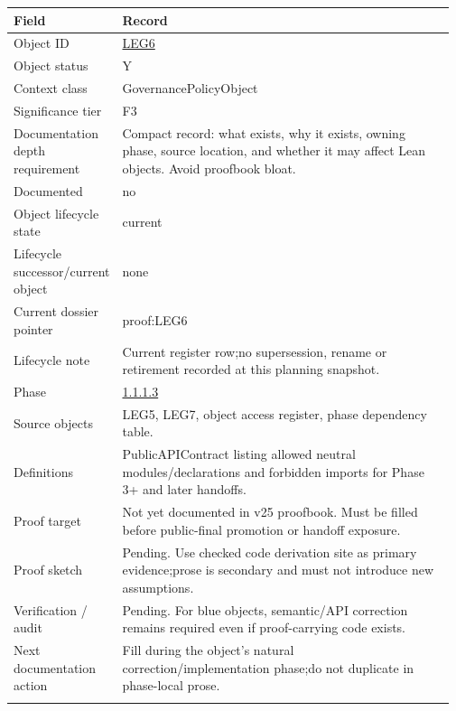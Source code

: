 \begin{longtable}{L{0.16\linewidth} L{0.81\linewidth}}
\hline
\textbf{Field} & \textbf{Record}\\
\hline
Object ID & \hyperlink{object-row-LEG6}{LEG6}\\
\hline\addlinespace[0.20em]
Object status & Y\\
\hline\addlinespace[0.20em]
Context class & GovernancePolicyObject\\
\hline\addlinespace[0.20em]
Significance tier & F3\\
\hline\addlinespace[0.20em]
Documentation depth requirement & Compact record: what exists, why it exists, owning phase, source location, and whether it may affect Lean objects. Avoid proofbook bloat.\\
\hline\addlinespace[0.20em]
Documented & no\\
\hline\addlinespace[0.20em]
Object lifecycle state & current\\
\hline\addlinespace[0.20em]
Lifecycle successor/\allowbreak{}current object & none\\
\hline\addlinespace[0.20em]
Current dossier pointer & proof:LEG6\\
\hline\addlinespace[0.20em]
Lifecycle note & Current register row;\newline no supersession, rename or retirement recorded at this planning snapshot.\\
\hline\addlinespace[0.20em]
Phase & \hyperlink{phase-row-1-1-1-3}{1.1.1.3}\\
\hline\addlinespace[0.20em]
Source objects & LEG5, LEG7, object access register, phase dependency table.\\
\hline\addlinespace[0.20em]
Definitions & PublicAPIContract listing allowed neutral modules/\allowbreak{}declarations and forbidden imports for Phase 3+ and later handoffs.\\
\hline\addlinespace[0.20em]
Proof target & Not yet documented in v25 proofbook. Must be filled before public-final promotion or handoff exposure.\\
\hline\addlinespace[0.20em]
Proof sketch & Pending. Use checked code derivation site as primary evidence;\newline prose is secondary and must not introduce new assumptions.\\
\hline\addlinespace[0.20em]
Verification /\allowbreak{} audit & Pending. For blue objects, semantic/\allowbreak{}API correction remains required even if proof-carrying code exists.\\
\hline\addlinespace[0.20em]
Next documentation action & Fill during the object's natural correction/\allowbreak{}implementation phase;\newline do not duplicate in phase-local prose.\\
\hline\addlinespace[0.20em]
\end{longtable}
